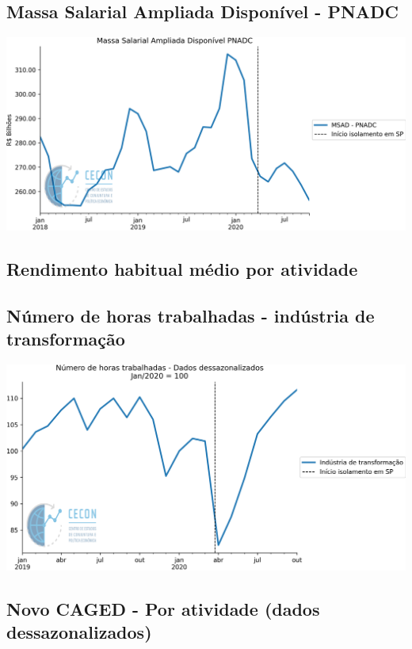 \documentclass{SelfArx}
\begin{document}
\subsection*{Massa Salarial Ampliada Disponível - PNADC}
\label{sec:orga965084}

\begin{center}
\includegraphics[width=.9\linewidth]{./figs/Emprego/MSAD.png}
\end{center}

\subsection*{Rendimento habitual médio por atividade}
\label{sec:orgb55c336}

\subsection*{Número de horas trabalhadas - indústria de transformação}
\label{sec:org5ee389a}

\begin{center}
\includegraphics[width=.9\linewidth]{./figs/Emprego/Horas_Transformacao.png}
\end{center}

\subsection*{Novo CAGED  - Por atividade (dados dessazonalizados)}
\label{sec:org6633c73}
\end{document}
